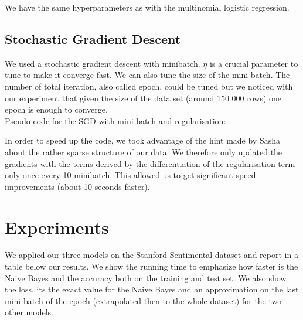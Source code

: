 \documentclass[11pt]{article}
\begin{document}
\noindent We have the same hyperparameters as with the multinomial logistic regression.

\subsection{Stochastic Gradient Descent}

We used a stochastic gradient descent with minibatch. $\eta$ is a crucial parameter to tune to make it converge fast. We can also tune the size of the mini-batch. The number of total iteration, also called epoch, could be tuned but we noticed with our experiment that given the size of the data set (around 150 000 rows) one epoch is enough to converge.\\


Pseudo-code for the SGD with mini-batch and regularisation:

  \begin{algorithmic}[1]
    \EndFor{}
    \EndFor{}
    \State{\Return{$\theta$}}
  \end{algorithmic}

In order to speed up the code, we took advantage of the hint made by Sasha about the rather sparse structure of our data. We therefore only updated the gradients with the terms derived by the differentiation of the regularisation term only once every 10 minibatch. This allowed us to get significant speed improvements (about 10 seconds faster).

\section{Experiments}

We applied our three models on the Stanford Sentimental dataset and report in a table below our results. We show the running time to emphasize how faster is the Naive Bayes and the accuracy both on the training and test set. We also show the loss, its the exact value for the Naive Bayes and an approximation on the last mini-batch of the epoch (extrapolated then to the whole dataset) for the two other models.\\
\end{document}
